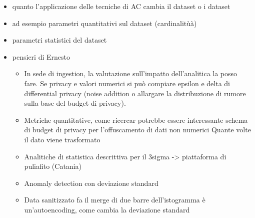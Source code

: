 \begin{itemize}
    \item quanto l'applicazione delle tecniche di AC cambia il dataset o i dataset
    \item ad esempio parametri quantitativi sul dataset (cardinalitùà)
    \item parametri statistici del dataset
    \item pensieri di Ernesto
    \begin{itemize}
        \item In sede di ingestion, la valutazione sull’impatto dell’analitica la posso fare. Se privacy e valori numerici si può compiare epsilon e delta di differential privacy (noise addition o allargare la distribuzione di rumore sulla base del budget di privacy). 
        \item Metriche quantitative, come ricercar potrebbe essere interessante schema di budget di privacy per l’offuscamento di dati non numerici Quante volte il dato viene trasformato
        \item Analitiche di statistica descrittiva per il 3sigma -> piattaforma di puliafito (Catania)
        \item Anomaly detection con deviazione standard
        \item Data sanitizzato fa il merge di due barre dell’istogramma è un’autoencoding, come cambia la deviazione standard
    \end{itemize}
\end{itemize}